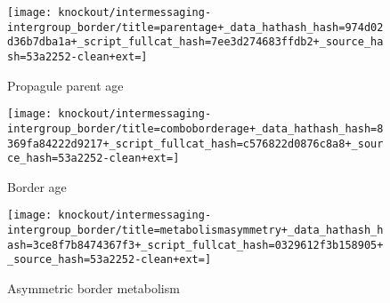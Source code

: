 \begin{figure*}[!htbp]
\begin{center}
\begin{minipage}[t]{\columnwidth}
\end{minipage}%
\begin{minipage}[t]{\columnwidth}
\centering

\hspace*{\fill}%
\begin{minipage}[t]{0.8\columnwidth}
\centering
\vspace{0pt} %
\begin{subfigure}[b]{\textwidth}
\texttt{[image: knockout/intermessaging-intergroup\_border/title=parentage+\_data\_hathash\_hash=974d02d36b7dba1a+\_script\_fullcat\_hash=7ee3d274683ffdb2+\_source\_hash=53a2252-clean+ext=]}%
\caption{Propagule parent age}
\label{fig:intermessaging-intergroup_border-pparentage}
\end{subfigure}
\end{minipage}%
\hspace*{\fill}

\vspace{1ex}

\hspace*{\fill}%
\begin{minipage}[t]{0.8\columnwidth}
\centering
\vspace{0pt} %
\begin{subfigure}[b]{\textwidth}
\texttt{[image: knockout/intermessaging-intergroup\_border/title=comboborderage+\_data\_hathash\_hash=8369fa84222d9217+\_script\_fullcat\_hash=c576822d0876c8a8+\_source\_hash=53a2252-clean+ext=]}%
\caption{Border age}
\label{fig:intermessaging-intergroup_border-borderage}
\end{subfigure}
\end{minipage}%
\hspace*{\fill}

\vspace{1ex}

\hspace*{\fill}%
\begin{minipage}[t]{0.8\columnwidth}
\centering
\vspace{0pt} %
\begin{subfigure}[b]{\textwidth}
\texttt{[image: knockout/intermessaging-intergroup\_border/title=metabolismasymmetry+\_data\_hathash\_hash=3ce8f7b8474367f3+\_script\_fullcat\_hash=0329612f3b158905+\_source\_hash=53a2252-clean+ext=]}%
\caption{Asymmetric border metabolism}
\label{fig:intermessaging-intergroup_border-metabolism}
\end{subfigure}
\end{minipage}%
\hspace*{\fill}


\end{minipage}
\end{center}
\end{figure*}
